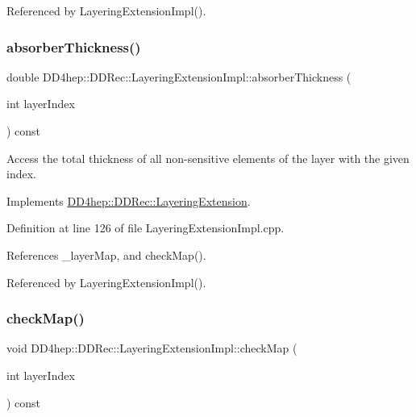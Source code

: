 Referenced by Layering\+Extension\+Impl().

\hypertarget{class_d_d4hep_1_1_d_d_rec_1_1_layering_extension_impl_a15a4c3dbf225ffc5958e19f1ae21439e}{}\label{class_d_d4hep_1_1_d_d_rec_1_1_layering_extension_impl_a15a4c3dbf225ffc5958e19f1ae21439e} 
\subsubsection{\texorpdfstring{absorber\+Thickness()}{absorberThickness()}}
{\footnotesize\ttfamily double D\+D4hep\+::\+D\+D\+Rec\+::\+Layering\+Extension\+Impl\+::absorber\+Thickness (\begin{DoxyParamCaption}\item[{int}]{layer\+Index }\end{DoxyParamCaption}) const\hspace{0.3cm}{\ttfamily [virtual]}}



Access the total thickness of all non-\/sensitive elements of the layer with the given index. 



Implements \hyperlink{class_d_d4hep_1_1_d_d_rec_1_1_layering_extension_ab4c19a0eccfd5cffc6816fa3b0ec9fb7}{D\+D4hep\+::\+D\+D\+Rec\+::\+Layering\+Extension}.



Definition at line 126 of file Layering\+Extension\+Impl.\+cpp.



References \+\_\+layer\+Map, and check\+Map().



Referenced by Layering\+Extension\+Impl().

\hypertarget{class_d_d4hep_1_1_d_d_rec_1_1_layering_extension_impl_a9e627cff66c5e52a883e91c1cb35075e}{}\label{class_d_d4hep_1_1_d_d_rec_1_1_layering_extension_impl_a9e627cff66c5e52a883e91c1cb35075e} 
\subsubsection{\texorpdfstring{check\+Map()}{checkMap()}}
{\footnotesize\ttfamily void D\+D4hep\+::\+D\+D\+Rec\+::\+Layering\+Extension\+Impl\+::check\+Map (\begin{DoxyParamCaption}\item[{int}]{layer\+Index }\end{DoxyParamCaption}) const\hspace{0.3cm}{\ttfamily [protected]}}



